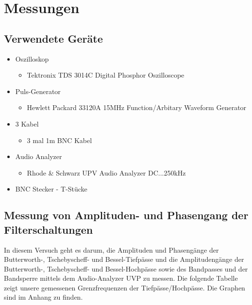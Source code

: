 \section{Messungen}
\subsection{Verwendete Geräte}

	\begin{itemize}
		\item Oszilloskop
		\begin{itemize}
			\item Tektronix TDS 3014C Digital Phosphor Oszilloscope
		\end{itemize}
		
		\item Puls-Generator
		\begin{itemize}
			\item Hewlett Packard 33120A 15MHz Function/Arbitary Waveform Generator
		\end{itemize}
		
		\item 3 Kabel
		\begin{itemize}
			\item 3 mal 1m BNC Kabel
		\end{itemize}
		
		\item Audio Analyzer
		\begin{itemize}
			\item Rhode \& Schwarz UPV Audio Analyzer DC...250kHz
		\end{itemize}
		
		\item BNC Stecker - T-Stücke
	\end{itemize}


\newpage

\subsection{Messung von Amplituden- und Phasengang der Filterschaltungen}
\noindent In diesem Versuch geht es darum, die Amplituden und Phasengänge der Butterworth-, Tschebyscheff- und Bessel-Tiefpässe und die Amplitudengänge der Butterworth-, Tschebyscheff- und Bessel-Hochpässe sowie des Bandpasses und der Bandsperre mittels dem Audio-Analyzer UVP zu messen. Die folgende Tabelle zeigt unsere gemessenen Grenzfrequenzen der Tiefpässe/Hochpässe. Die Graphen sind im Anhang zu finden.

